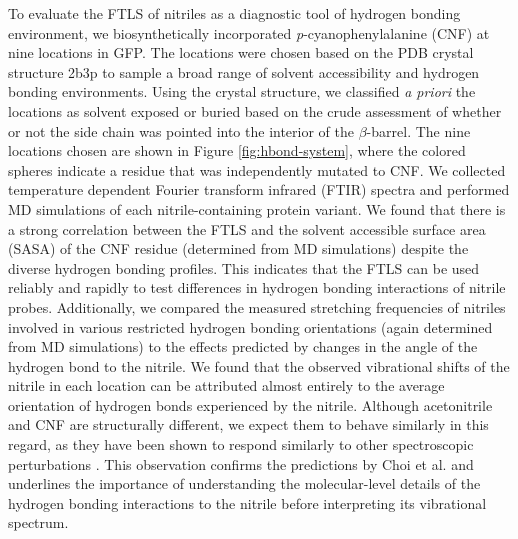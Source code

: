 To evaluate the FTLS of nitriles as a diagnostic tool of hydrogen bonding environment, we biosynthetically incorporated \emph{p}-cyanophenylalanine (CNF) at nine locations in GFP.
The locations were chosen based on the PDB crystal structure 2b3p\cite{Pedelacq2006} to sample a broad range of solvent accessibility and hydrogen bonding environments.
Using the crystal structure, we classified \emph{a priori} the locations as solvent exposed or buried based on the crude assessment of whether or not the side chain was pointed into the interior of the $\beta$-barrel.
The nine locations chosen are shown in Figure \ref{fig:hbond-system}, where the colored spheres indicate a residue that was independently mutated to CNF.
We collected temperature dependent Fourier transform infrared (FTIR) spectra and performed MD simulations of each nitrile-containing protein variant.
We found that there is a strong correlation between the FTLS and the solvent accessible surface area (SASA) of the CNF residue (determined from MD simulations) despite the diverse hydrogen bonding profiles.
This indicates that the FTLS can be used reliably and rapidly to test differences in hydrogen bonding interactions of nitrile probes.
Additionally, we compared the measured stretching frequencies of nitriles involved in various restricted hydrogen bonding orientations (again determined from MD simulations) to the effects predicted by changes in the angle of the hydrogen bond to the nitrile.
We found that the observed vibrational shifts of the nitrile in each location can be attributed almost entirely to the average orientation of hydrogen bonds experienced by the nitrile.
Although acetonitrile and CNF are structurally different, we expect them to behave similarly in this regard, as they have been shown to respond similarly to other spectroscopic perturbations \cite{Getahun2003}.
This observation confirms the predictions by Choi et al. and underlines the importance of understanding the molecular-level details of the hydrogen bonding interactions to the nitrile  before interpreting its vibrational spectrum.

